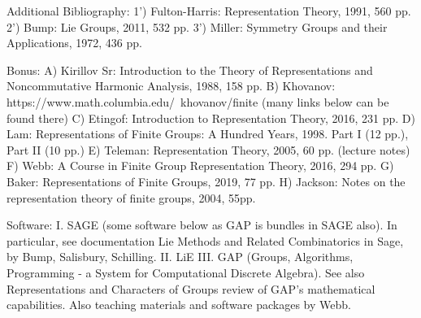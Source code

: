 Additional Bibliography:
1') Fulton-Harris: Representation Theory, 1991, 560 pp.
2') Bump: Lie Groups, 2011, 532 pp.
3') Miller: Symmetry Groups and their Applications, 1972, 436 pp.

Bonus:
A) Kirillov Sr: Introduction to the Theory of Representations and Noncommutative Harmonic Analysis, 1988, 158 pp.
B) Khovanov: https://www.math.columbia.edu/~khovanov/finite (many links below can be found there)
C) Etingof: Introduction to Representation Theory, 2016, 231 pp.
D) Lam: Representations of Finite Groups: A Hundred Years, 1998. Part I (12 pp.), Part II (10 pp.)
E) Teleman: Representation Theory, 2005, 60 pp. (lecture notes)
F) Webb: A Course in Finite Group Representation Theory, 2016, 294 pp.
G) Baker: Representations of Finite Groups, 2019, 77 pp.
H) Jackson: Notes on the representation theory of finite groups, 2004, 55pp.

Software:
I. SAGE (some software below as GAP is bundles in SAGE also). In particular, see documentation Lie Methods and Related Combinatorics in Sage, by Bump, Salisbury, Schilling.
II. LiE
III. GAP (Groups, Algorithms, Programming - a System for Computational Discrete Algebra). See also Representations and Characters of Groups review of GAP's mathematical capabilities. Also teaching materials and software packages by Webb.
